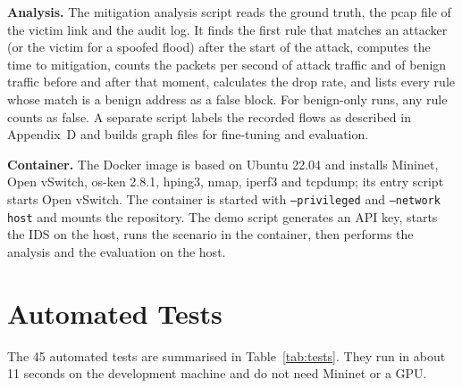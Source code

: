 \textbf{Analysis.} The mitigation analysis script reads the ground truth, the pcap file of the victim link and the audit log. It finds the first rule that matches an attacker (or the victim for a spoofed flood) after the start of the attack, computes the time to mitigation, counts the packets per second of attack traffic and of benign traffic before and after that moment, calculates the drop rate, and lists every rule whose match is a benign address as a false block. For benign-only runs, any rule counts as false. A separate script labels the recorded flows as described in Appendix~D and builds graph files for fine-tuning and evaluation.

\textbf{Container.} The Docker image is based on Ubuntu 22.04 and installs Mininet, Open vSwitch, os-ken 2.8.1, hping3, nmap, iperf3 and tcpdump; its entry script starts Open vSwitch. The container is started with \texttt{--privileged} and \texttt{--network host} and mounts the repository. The demo script generates an API key, starts the IDS on the host, runs the scenario in the container, then performs the analysis and the evaluation on the host.

\section{Automated Tests}
The 45 automated tests are summarised in Table~\ref{tab:tests}. They run in about 11 seconds on the development machine and do not need Mininet or a GPU.

